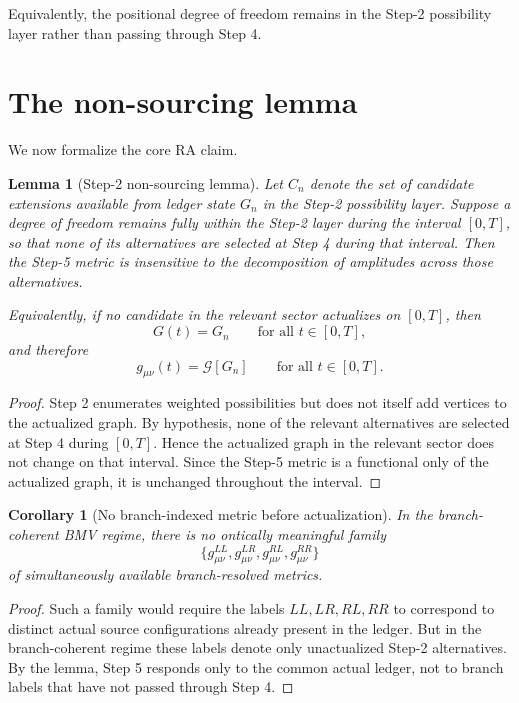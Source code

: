 \documentclass[11pt]{article}
\newtheorem{lemma}{Lemma}
\newtheorem{corollary}{Corollary}
\begin{document}
Equivalently, the positional degree of freedom remains in the Step-2 possibility layer rather than passing through Step 4.

\section{The non-sourcing lemma}

We now formalize the core RA claim.

\begin{lemma}[Step-2 non-sourcing lemma]
Let $C_n$ denote the set of candidate extensions available from ledger state $G_n$ in the Step-2 possibility layer. Suppose a degree of freedom remains fully within the Step-2 layer during the interval $[0,T]$, so that none of its alternatives are selected at Step 4 during that interval. Then the Step-5 metric is insensitive to the decomposition of amplitudes across those alternatives.

Equivalently, if no candidate in the relevant sector actualizes on $[0,T]$, then
\begin{equation}
G(t) = G_n \qquad \text{for all } t\in[0,T],
\end{equation}
and therefore
\begin{equation}
g_{\mu\nu}(t) = \mathcal{G}[G_n] \qquad \text{for all } t\in[0,T].
\end{equation}
\end{lemma}

\begin{proof}
Step 2 enumerates weighted possibilities but does not itself add vertices to the actualized graph. By hypothesis, none of the relevant alternatives are selected at Step 4 during $[0,T]$. Hence the actualized graph in the relevant sector does not change on that interval. Since the Step-5 metric is a functional only of the actualized graph, it is unchanged throughout the interval. \qedhere
\end{proof}

\begin{corollary}[No branch-indexed metric before actualization]
In the branch-coherent BMV regime, there is no ontically meaningful family
\begin{equation}
\{g^{LL}_{\mu\nu}, g^{LR}_{\mu\nu}, g^{RL}_{\mu\nu}, g^{RR}_{\mu\nu}\}
\end{equation}
of simultaneously available branch-resolved metrics.
\end{corollary}

\begin{proof}
Such a family would require the labels $LL,LR,RL,RR$ to correspond to distinct actual source configurations already present in the ledger. But in the branch-coherent regime these labels denote only unactualized Step-2 alternatives. By the lemma, Step 5 responds only to the common actual ledger, not to branch labels that have not passed through Step 4. \qedhere
\end{proof}
\end{document}
